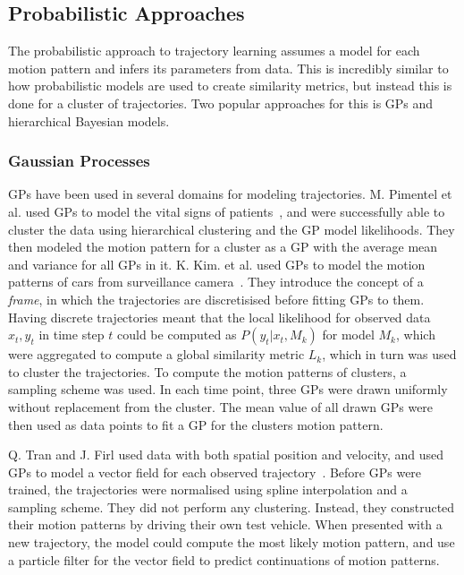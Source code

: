 \subsection{Probabilistic Approaches}
The probabilistic approach to trajectory learning assumes a model for each motion pattern
and infers its parameters from data. This is incredibly similar to how
probabilistic models are used to create similarity metrics, but instead this
is done for a cluster of trajectories. Two popular approaches for this
is GPs and hierarchical Bayesian models.

\subsubsection{Gaussian Processes}
GPs have been used in several domains for modeling trajectories.
M. Pimentel et al. used GPs to model the vital signs of patients~\cite{Pimentel2013Sep}, 
and were successfully able to cluster the data using hierarchical clustering
and the GP model likelihoods. They then modeled the motion pattern
for a cluster as a GP with the average mean and variance for all GPs in it.
K. Kim. et al. used GPs to model the motion patterns of cars from
surveillance camera~\cite{Kim2011Nov}. They introduce the
concept of a \textit{frame}, in which the trajectories are
discretisised before fitting GPs to them. Having discrete trajectories meant that
the local likelihood for observed data $x_t, y_t$ in time step $t$
could be computed as $P(y_t | x_t, {M_k})$ for model $M_k$, which
were aggregated to compute a global similarity metric $L_k$,
which in turn was used to cluster the trajectories. To compute the motion
patterns of clusters, a sampling scheme was used. In each time
point, three GPs were drawn uniformly without replacement from the
cluster. The mean value of all drawn GPs were then used as data points
to fit a GP for the clusters motion pattern.

Q. Tran and J. Firl used data with both spatial position and velocity,
and used GPs to model a vector field for each observed
trajectory~\cite{Tran2014Jun}. Before GPs were trained, the trajectories 
were normalised using spline interpolation and a
sampling scheme. They did not perform any clustering. Instead, they
constructed their motion patterns by driving their own test vehicle. 
When presented with a new trajectory, the model could compute the most
likely motion pattern, and use a particle filter for the vector
field to predict continuations of motion patterns. 


